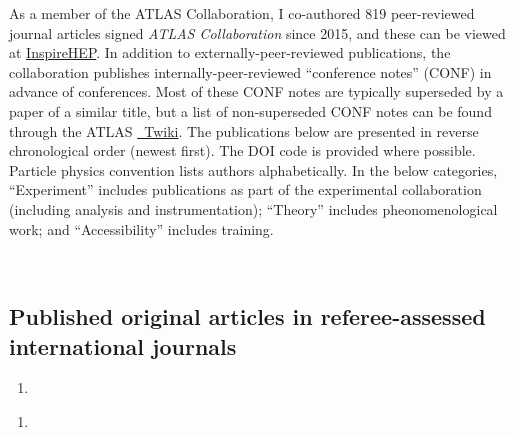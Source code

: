 \noindent As a member of the ATLAS Collaboration, I co-authored 819 peer-reviewed journal articles signed \textsl{ATLAS Collaboration} since 2015, and these can be viewed at \href{https://inspirehep.net/authors/1319078}{InspireHEP}.
In addition to externally-peer-reviewed publications, the collaboration publishes internally-peer-reviewed \enquote{conference notes} (CONF) in advance of conferences.
Most of these CONF notes are typically superseded by a paper of a similar title, but a list of non-superseded CONF notes can be found through the ATLAS \href{https://twiki.cern.ch/twiki/bin/view/AtlasPublic/CONFnotes}{~Twiki}.
The publications below are presented in reverse chronological order (newest first).
The DOI code is provided where possible.
Particle physics convention lists authors alphabetically.
In the below categories, \enquote{Experiment} includes publications as part of the experimental collaboration (including analysis and instrumentation); \enquote{Theory} includes pheonomenological work; and \enquote{Accessibility} includes training.

\begin{center}
  ~%
  ~%
  ~%
  ~%
\end{center}

\subsection{Published original articles in referee-assessed international journals}\label{ssec:published-original-articles-in-referee-assessed-international-journals}

\setcounter{enumi}{0}
\begin{enumerate}[label=\PubCite{darkgray}{white}{\arabic*},resume]
  \item {}
\end{enumerate}

\begin{enumerate}[label=\PubCite{blue}{white}{\arabic*},resume]
  \item {}
\end{enumerate}

